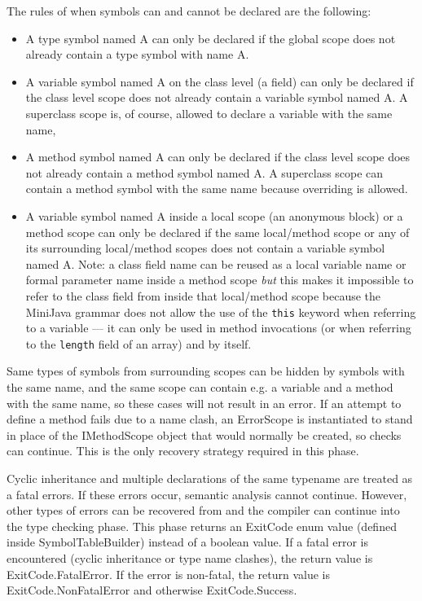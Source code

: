 \documentclass[a4paper,11pt]{article}
\begin{document}
The rules of when symbols can and cannot be declared are the following:
\begin{itemize}
    \item A type symbol named A can only be declared if the global scope does not already contain a type symbol with name A.
    \item A variable symbol named A on the class level (a field) can only be declared if the class level scope does not already contain a variable symbol named A. A superclass scope is, of course, allowed to declare a variable with the same name, 
    \item A method symbol named A can only be declared if the class level scope does not already contain a method symbol named A. A superclass scope can contain a method symbol with the same name because overriding is allowed.
    \item A variable symbol named A inside a local scope (an anonymous block) or a method scope can only be declared if the same local/method scope or any of its surrounding local/method scopes does not contain a variable symbol named A. Note: a class field name can be reused as a local variable name or formal parameter name inside a method scope \emph{but} this makes it impossible to refer to the class field from inside that local/method scope because the MiniJava grammar does not allow the use of the \verb,this, keyword when referring to a variable --- it can only be used in method invocations (or when referring to the \verb,length, field of an array) and by itself.
\end{itemize}

Same types of symbols from surrounding scopes can be hidden by symbols with the same name, and the same scope can contain e.g. a variable and a method with the same name, so these cases will not result in an error. If an attempt to define a method fails due to a name clash, an ErrorScope is instantiated to stand in place of the IMethodScope object that would normally be created, so checks can continue. This is the only recovery strategy required in this phase.

Cyclic inheritance and multiple declarations of the same typename are treated as a fatal errors. If these errors occur, semantic analysis cannot continue. However, other types of errors can be recovered from and the compiler can continue into the type checking phase. This phase returns an ExitCode enum value (defined inside SymbolTableBuilder) instead of a boolean value. If a fatal error is encountered (cyclic inheritance or type name clashes), the return value is ExitCode.FatalError. If the error is non-fatal, the return value is ExitCode.NonFatalError and otherwise ExitCode.Success.
\end{document}
